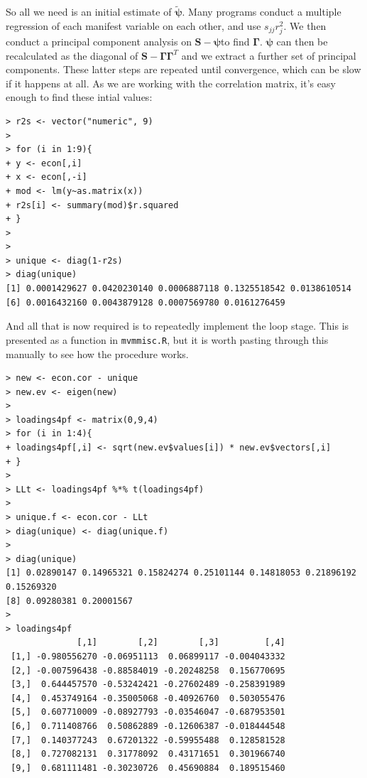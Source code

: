 So all we need is an initial estimate of $\widetilde{\boldsymbol{\psi}}$.   Many programs conduct a multiple regression of each manifest variable on each other, and use $s_{jj} r_{j}^{2}$.   We then conduct a principal component analysis on $\boldsymbol{S} - \boldsymbol{\psi}$to find $\boldsymbol{\Gamma}$.   $\boldsymbol{\psi}$ can then be recalculated as the diagonal of $\boldsymbol{S} - \boldsymbol{\Gamma} \boldsymbol{\Gamma}^{T}$ and we extract a further set of principal components.   These latter steps are repeated until convergence, which can be slow if it happens at all.   As we are working with the correlation matrix, it's easy enough to find these intial values:

\singlespacing
\begin{verbatim}
> r2s <- vector("numeric", 9)
> 
> for (i in 1:9){
+ y <- econ[,i]
+ x <- econ[,-i]
+ mod <- lm(y~as.matrix(x))
+ r2s[i] <- summary(mod)$r.squared
+ }
> 
> 
> unique <- diag(1-r2s)
> diag(unique)
[1] 0.0001429627 0.0420230140 0.0006887118 0.1325518542 0.0138610514
[6] 0.0016432160 0.0043879128 0.0007569780 0.0161276459
\end{verbatim}
\onehalfspacing

And all that is now required is to repeatedly implement the loop stage.   This is presented as a function in \texttt{mvmmisc.R}, but it is worth pasting through this manually to see how the procedure works.   

\singlespacing
\begin{verbatim}
> new <- econ.cor - unique
> new.ev <- eigen(new)
> 
> loadings4pf <- matrix(0,9,4)
> for (i in 1:4){
+ loadings4pf[,i] <- sqrt(new.ev$values[i]) * new.ev$vectors[,i]
+ }
> 
> LLt <- loadings4pf %*% t(loadings4pf)
> 
> unique.f <- econ.cor - LLt
> diag(unique) <- diag(unique.f)
> 
> diag(unique)
[1] 0.02890147 0.14965321 0.15824274 0.25101144 0.14818053 0.21896192 0.15269320
[8] 0.09280381 0.20001567
> 
> loadings4pf
              [,1]        [,2]        [,3]         [,4]
 [1,] -0.980556270 -0.06951113  0.06899117 -0.004043332
 [2,] -0.007596438 -0.88584019 -0.20248258  0.156770695
 [3,]  0.644457570 -0.53242421 -0.27602489 -0.258391989
 [4,]  0.453749164 -0.35005068 -0.40926760  0.503055476
 [5,]  0.607710009 -0.08927793 -0.03546047 -0.687953501
 [6,]  0.711408766  0.50862889 -0.12606387 -0.018444548
 [7,]  0.140377243  0.67201322 -0.59955488  0.128581528
 [8,]  0.727082131  0.31778092  0.43171651  0.301966740
 [9,]  0.681111481 -0.30230726  0.45690884  0.189515460
\end{verbatim}
\onehalfspacing

